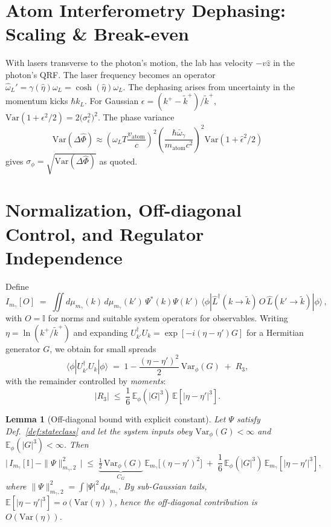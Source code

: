 \documentclass[aps,11pt]{article}
\providecommand{\bra}[1]{\langle #1|}
\providecommand{\ket}[1]{|#1\rangle}
\newcommand{\Var}{\mathrm{Var}}
\newcommand{\E}{\mathbb{E}}
\newcommand{\kplus}{k^{+}}
\newcommand{\ktil}{\tilde{k}^{+}}
\newtheorem{lem}{Lemma}
\begin{document}
\section{Atom Interferometry Dephasing: Scaling \& Break-even}\label{app:C}
With lasers transverse to the photon's motion, the lab has velocity \(-v\hat{z}\) in the photon's QRF. The laser frequency becomes an operator \(\hat\omega_L'=\gamma(\hat\eta)\omega_L=\cosh(\hat\eta)\omega_L\). The dephasing arises from uncertainty in the momentum kicks \(\hbar k_L\). For Gaussian \(\epsilon=(\kplus-\ktil)/\ktil\), \(\Var(1+\epsilon^2/2)=2\big(\sigma_{\epsilon}^{2}\big)^{2}\). The phase variance
\begin{equation}
\Var(\Delta\hat\Phi)\approx
\left(\omega_LT\frac{v_{\mathrm{atom}}}{c}\right)^{2}
\left(\frac{\hbar\bar\omega_\gamma}{m_{\mathrm{atom}}c^{2}}\right)^{2}\Var(1+\hat\epsilon^{2}/2)
\end{equation}
gives \(\sigma_\phi=\sqrt{\Var(\Delta\hat\Phi)}\) as quoted.

\section{Normalization, Off-diagonal Control, and Regulator Independence}\label{app:D}
Define
\begin{equation}
I_{m_\gamma}[O]\;=\;\iint d\mu_{m_\gamma}(k)\, d\mu_{m_\gamma}(k')\, \Psi^*(k)\Psi(k')\, \bra{\phi} \hat L^\dagger(k\!\to\!\tilde k)\,O\, \hat L(k'\!\to\!\tilde k)\ket{\phi}\,,
\end{equation}
with \(O=\mathbb I\) for norms and suitable system operators for observables. Writing \(\eta=\ln(\kplus/\ktil)\) and expanding \(U_{k'}^\dagger U_{k}=\exp[-i(\eta-\eta')G]\) for a Hermitian generator \(G\), we obtain for small spreads
\begin{equation}
\bra{\phi}U_{k'}^\dagger U_k\ket{\phi}\;=\;1-\frac{(\eta-\eta')^{2}}{2}\,\Var_\phi(G)\;+\;R_3,
\end{equation}
with the remainder controlled by \emph{moments}:
\begin{equation}
|R_3|\;\le\; \frac{1}{6}\,\E_\phi(|G|^{3})\,\E\!\left[|\eta-\eta'|^{3}\right].
\end{equation}

\begin{lem}[Off-diagonal bound with explicit constant]\label{lem:offdiag}
Let \(\Psi\) satisfy Def.~\ref{def:stateclass} and let the system inputs obey \(\Var_\phi(G)<\infty\) and \(\E_\phi(|G|^{3})<\infty\). Then
\begin{equation}
\Big|\,I_{m_\gamma}[\mathbb I] - \|\Psi\|_{m_\gamma,2}^{2}\,\Big|\;\le\; \underbrace{\tfrac12\,\Var_\phi(G)}_{C_G}\,\E_{m_\gamma}\!\big[(\eta-\eta')^{2}\big]\;+\; \frac{1}{6}\,\E_\phi(|G|^{3})\,\E_{m_\gamma}[|\eta-\eta'|^{3}],
\end{equation}
where \(\|\Psi\|_{m_\gamma,2}^{2}=\int |\Psi|^{2}\,d\mu_{m_\gamma}\). By sub-Gaussian tails, \(\E[|\eta-\eta'|^{3}]=o(\Var(\eta))\), hence the off-diagonal contribution is \(O(\Var(\eta))\).
\end{lem}
\end{document}
